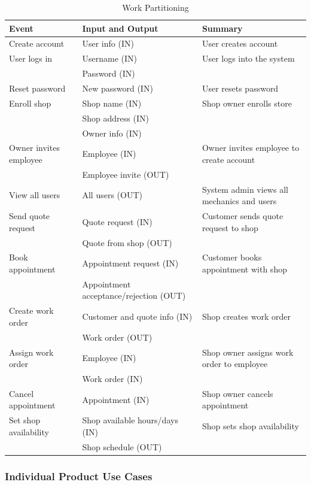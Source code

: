 \documentclass[12pt]{article}
\begin{document}
\begin{center}
\begin{longtable}{|p{4cm}|p{5cm}|p{6cm}|}
\caption{Work Partitioning}
\label{tab:WorkPartitioning} \\
\hline
 \textbf{Event} & \textbf{Input and Output} & \textbf{Summary} \\
\hline
Create account & User info (IN) & User creates account \\
\hline
User logs in & Username (IN) & User logs into the system \\
 & Password (IN) & \\
\hline
Reset password & New password (IN) & User resets password \\
\hline
Enroll shop & Shop name (IN) & Shop owner enrolls store \\
 & Shop address (IN) & \\
 & Owner info (IN) & \\
\hline
Owner invites employee & Employee (IN) & Owner invites employee to create account \\
& Employee invite (OUT) & \\
\hline
View all users & All users (OUT) & System admin views all mechanics and users \\
\hline
Send quote request & Quote request (IN) & Customer sends quote request to shop \\
 & Quote from shop (OUT) & \\
\hline
Book appointment & Appointment request (IN) & Customer books appointment with shop \\
 & Appointment acceptance/rejection (OUT) & \\
\hline
Create work order & Customer and quote info (IN) & Shop creates work order \\
 & Work order (OUT) & \\
\hline
Assign work order & Employee (IN) & Shop owner assigns work order to employee \\
 & Work order (IN) & \\
\hline
Cancel appointment & Appointment (IN) & Shop owner cancels appointment \\
\hline
Set shop availability & Shop available hours/days (IN) & Shop sets shop availability \\
 & Shop schedule (OUT) & \\
\hline
\end{longtable}
\end{center}

\subsubsection{Individual Product Use Cases}
\end{document}
